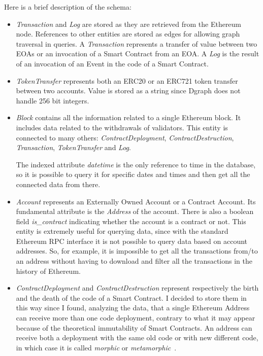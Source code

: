 \noindent Here is a brief description of the schema:

\begin{itemize}

    \item \textit{Transaction} and \textit{Log} are stored as they are retrieved from the Ethereum node. References to other entities are stored as edges for allowing graph traversal in queries. A \textit{Transaction} represents a transfer of value between two EOAs or an invocation of a Smart Contract from an EOA. A \textit{Log} is the result of an invocation of an Event in the code of a Smart Contract.

    \item \textit{TokenTransfer} represents both an ERC20 or an ERC721 token transfer between two accounts. Value is stored as a string since Dgraph does not handle 256 bit integers.
    
    \item \textit{Block} contains all the information related to a single Ethereum block. It includes data related to the withdrawals of validators. This entity is connected to many others: \textit{ContractDeployment}, \textit{ContractDestruction}, \textit{Transaction}, \textit{TokenTransfer} and \textit{Log}. 
    
    The indexed attribute \textit{datetime} is the only reference to time in the database, so it is possible to query it for specific dates and times and then get all the connected data from there. 

    \item \textit{Account} represents an Externally Owned Account or a Contract Account. Its fundamental attribute is the \textit{Address} of the account. There is also a boolean field \textit{is\_contract} indicating whether the account is a contract or not. This entity is extremely useful for querying data, since with the standard Ethereum RPC interface it is not possible to query data based on account addresses. So, for example, it is impossible to get all the transactions from/to an address without having to download and filter all the transactions in the history of Ethereum.

    \item \textit{ContractDeployment} and \textit{ContractDestruction} represent respectively the birth and the death of the code of a Smart Contract. I decided to store them in this way since I found, analyzing the data, that a single Ethereum Address can receive more than one code deployment, contrary to what it may appear because of the theoretical immutability of Smart Contracts. An address can receive both a deployment with the same old code or with new different code, in which case it is called \textit{morphic} or \textit{metamorphic}~\cite{create2-metamorphic}.


\end{itemize}
